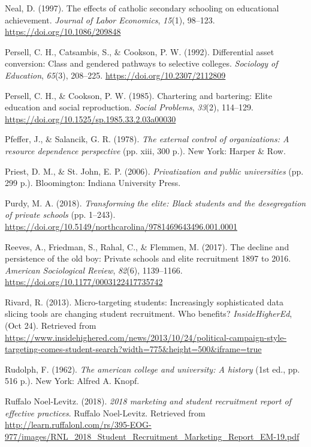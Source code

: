 \documentclass[
  12pt,
]{article}
\newlength{\cslhangindent}
\newenvironment{CSLReferences}[2] %
 {\begin{list}{}{%
  \setlength{\itemindent}{0pt}
  \setlength{\leftmargin}{0pt}
  \setlength{\parsep}{0pt}
  \ifodd #1
   \setlength{\leftmargin}{\cslhangindent}
   \setlength{\itemindent}{-1\cslhangindent}
  \fi
  \setlength{\itemsep}{#2\baselineskip}}}
 {\end{list}}
\begin{document}
\begin{CSLReferences}{1}{0}
Neal, D. (1997). The effects of catholic secondary schooling on educational achievement. \emph{Journal of Labor Economics}, \emph{15}(1), 98--123. \url{https://doi.org/10.1086/209848}

Persell, C. H., Catsambis, S., \& Cookson, P. W. (1992). Differential asset conversion: Class and gendered pathways to selective colleges. \emph{Sociology of Education}, \emph{65}(3), 208--225. \url{https://doi.org/10.2307/2112809}

Persell, C. H., \& Cookson, P. W. (1985). Chartering and bartering: Elite education and social reproduction. \emph{Social Problems}, \emph{33}(2), 114--129. \url{https://doi.org/10.1525/sp.1985.33.2.03a00030}

Pfeffer, J., \& Salancik, G. R. (1978). \emph{The external control of organizations: A resource dependence perspective} (pp. xiii, 300 p.). New York: Harper \& Row.

Priest, D. M., \& St. John, E. P. (2006). \emph{Privatization and public universities} (pp. 299 p.). Bloomington: Indiana University Press.

Purdy, M. A. (2018). \emph{Transforming the elite: Black students and the desegregation of private schools} (pp. 1--243). \url{https://doi.org/10.5149/northcarolina/9781469643496.001.0001}

Reeves, A., Friedman, S., Rahal, C., \& Flemmen, M. (2017). The decline and persistence of the old boy: Private schools and elite recruitment 1897 to 2016. \emph{American Sociological Review}, \emph{82}(6), 1139--1166. \url{https://doi.org/10.1177/0003122417735742}

Rivard, R. (2013). Micro-targeting students: Increasingly sophisticated data slicing tools are changing student recruitment. Who benefits? \emph{InsideHigherEd}, (Oct 24). Retrieved from \url{https://www.insidehighered.com/news/2013/10/24/political-campaign-style-targeting-comes-student-search?width=775&height=500&iframe=true}

Rudolph, F. (1962). \emph{The american college and university: A history} (1st ed., pp. 516 p.). New York: Alfred A. Knopf.

Ruffalo Noel-Levitz. (2018). \emph{2018 marketing and student recruitment report of effective practices}. Ruffalo Noel-Levitz. Retrieved from \url{http://learn.ruffalonl.com/rs/395-EOG-977/images/RNL_2018_Student_Recruitment_Marketing_Report_EM-19.pdf}


\end{CSLReferences}
\end{document}
